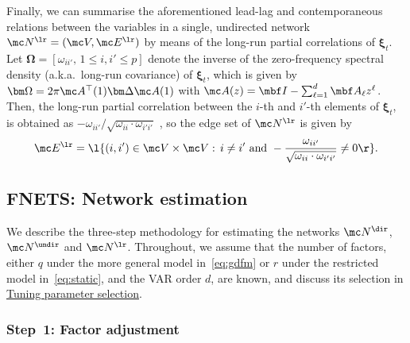 Finally, we can summarise the aforementioned lead-lag and contemporaneous relations between the variables in a single, undirected network $\mc N^{\lr} = (\mc V, \mc E^{\lr})$ by means of the long-run partial correlations of $\bm\xi_t$. 
Let $\bm\Omega = [\omega_{ii'}, \, 1 \le i, i' \le p]$ denote the inverse of the zero-frequency spectral density (a.k.a.\ long-run covariance) of $\bm\xi_t$, which is given by $\bm \Omega = 2\pi \mc A^\top(1) \bm\Delta \mc A(1)$ with $\mc A(z) = \mbf I - \sum_{\ell = 1}^{d} \mbf A_\ell z^\ell$.
Then, the long-run partial correlation between the $i$-th and $i'$-th elements of $\bm\xi_t$, is obtained as $- \omega_{ii'}/\sqrt{\omega_{ii} \cdot \omega_{i'i'}}$ \citep{dahlhaus2000graphical}, so the edge set of $\mc N^{\lr}$ is given by
\begin{align}
\label{eq:net:lr}
\mc E^{\lr} = \l\{ (i, i') \in \mc V \times \mc V: \, i \ne i' \text{ and }
- \frac{\omega_{ii'}}{\sqrt{\omega_{ii} \cdot \omega_{i'i'}}} \ne 0 \r\}.
\end{align}
\subsection{FNETS: Network estimation}    
\label{sec:estimation}

We describe the three-step methodology for estimating the networks $\mc N^{\dir}$, $\mc N^{\undir}$ and $\mc N^{\lr}$.
Throughout, we assume that the number of factors, either $q$ under the more general model in~\eqref{eq:gdfm} or $r$ under the restricted model in~\eqref{eq:static}, and the VAR order $d$, are known, and discuss its selection in \hyperref[sec:tuning]{Tuning parameter selection}. 

\subsubsection{Step~1: Factor adjustment}
\label{sec:step:one}

